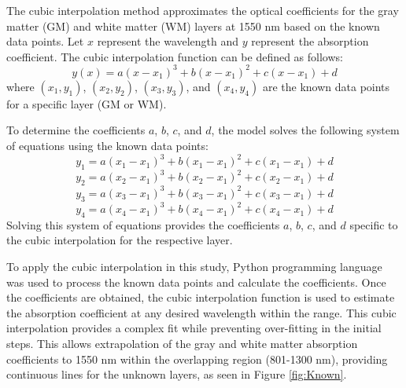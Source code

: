 \documentclass[journal,twoside,web]{ieeecolor}
\begin{document}
The cubic interpolation method approximates the optical coefficients for the gray matter (GM) and white matter (WM) layers at 1550 nm based on the 
known data points. Let $x$ represent the wavelength and $y$ represent the absorption coefficient. The cubic interpolation function can be defined as follows:
\begin{equation}
    \label{eq:cubicEq1}
    y(x) = a(x-x_1)^3 + b(x-x_1)^2 + c(x-x_1) + d
\end{equation}
where $(x_1, y_1)$, $(x_2, y_2)$, $(x_3, y_3)$, and $(x_4, y_4)$ are the known data points for a specific layer (GM or WM).

To determine the coefficients $a$, $b$, $c$, and $d$, the model solves the following system of equations using the known data points:
\begin{equation}
    \label{eq:cubicEq2}
    y_1 = a(x_1-x_1)^3 + b(x_1-x_1)^2 + c(x_1-x_1) + d 
\end{equation}
\begin{equation}
    \label{eq:cubicEq3}
    y_2 = a(x_2-x_1)^3 + b(x_2-x_1)^2 + c(x_2-x_1) + d 
\end{equation}
\begin{equation}
    \label{eq:cubicEq4}
    y_3 = a(x_3-x_1)^3 + b(x_3-x_1)^2 + c(x_3-x_1) + d 
\end{equation}
\begin{equation}
    \label{eq:cubicEq5}
    y_4 = a(x_4-x_1)^3 + b(x_4-x_1)^2 + c(x_4-x_1) + d 
\end{equation}
Solving this system of equations provides the coefficients $a$, $b$, $c$, and $d$ specific to the cubic interpolation for the respective layer.

To apply the cubic interpolation in this study, Python programming language was used to process the known data points and calculate the coefficients. 
Once the coefficients are obtained, the cubic interpolation function is used to estimate the absorption coefficient at any desired wavelength within the range. 
This cubic interpolation provides a complex fit while preventing over-fitting in the initial steps. This allows extrapolation of the gray and white matter 
absorption coefficients to 1550 nm within the overlapping region (801-1300 nm), providing continuous lines for the unknown layers, as seen in Figure \ref{fig:Known}.
\end{document}
